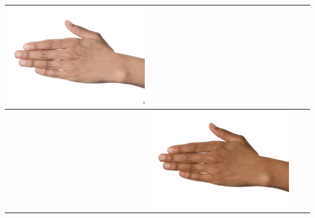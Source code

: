 \begin{longtable}{|N||c|c|c|}
\begin{minipage}{.29\textwidth}
    \includegraphics[width=\textwidth,height=\textheight,keepaspectratio]{../rc_test/outputs/20170516_proportional_test/hand_brown_to_hand_light.jpg}
  \end{minipage} \\
\hline  \label{row:prop_test_hand_brown_to_hand_pale} &
  \begin{minipage}{.29\textwidth}
    \includegraphics[width=\textwidth,height=\textheight,keepaspectratio]{../inputs/hand_brown.jpg}
  \end{minipage} & 
  \begin{minipage}{.29\textwidth}

\end{minipage}
\end{longtable}
